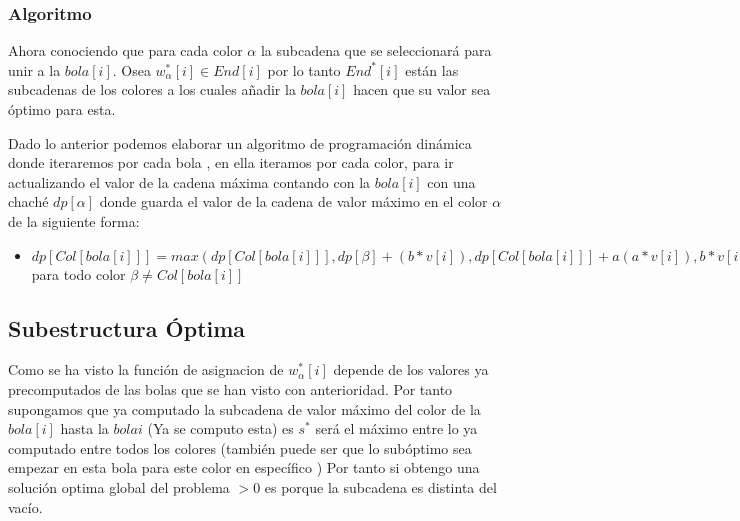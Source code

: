 \documentclass{article}
\begin{document}
\subsubsection{Algoritmo}
Ahora conociendo que para cada color $\alpha$ la subcadena que se seleccionará para unir a la $bola[i]$.
Osea  $w^*_\alpha[i] \in End[i]$ por lo tanto $End^*[i]$ están las subcadenas de los colores a los cuales añadir la $bola[i]$ hacen que su 
valor sea óptimo para esta.

Dado lo anterior podemos elaborar un algoritmo de programación dinámica donde iteraremos por cada bola , en ella iteramos por cada color, 
para ir actualizando el valor de la cadena máxima contando con la $bola[i]$ con una chaché $dp[\alpha]$ donde guarda el valor de la cadena de valor máximo
en el color $\alpha$ de la siguiente forma:

\begin{itemize}
  \item $ dp[Col[bola[i]]]=max(dp[Col[bola[i]]],dp[\beta]+(b*v[i]), dp[Col[bola[i]]]+a(a*v[i]), b*v[i])$ para todo color $\beta \neq Col[bola[i]]$
\end{itemize}

\subsection{Subestructura Óptima}
Como se ha visto la función de asignacion de $w^*_\alpha[i]$ depende de los valores ya precomputados de las bolas que se han visto con anterioridad.
Por tanto supongamos que ya computado la subcadena de valor máximo del color de la $bola[i]$ hasta la $bola{i}$ (Ya se computo esta)
es $s^*$ será el máximo entre lo ya computado entre todos los colores (también puede ser que lo subóptimo sea empezar en esta bola para este color en específico )
Por tanto si obtengo una solución optima global del problema $>0$ es porque la subcadena es distinta del vacío.
\end{document}
